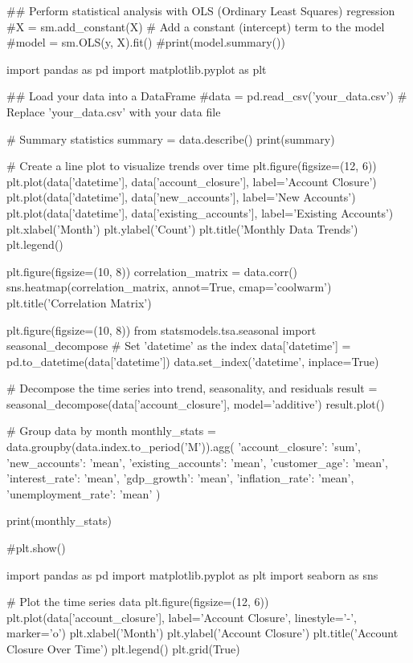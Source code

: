 ## Perform statistical analysis with OLS (Ordinary Least Squares) regression
#X = sm.add_constant(X)  # Add a constant (intercept) term to the model
#model = sm.OLS(y, X).fit()
#print(model.summary())





import pandas as pd
import matplotlib.pyplot as plt

## Load your data into a DataFrame
#data = pd.read_csv('your_data.csv')  # Replace 'your_data.csv' with your data file

# Summary statistics
summary = data.describe()
print(summary)

# Create a line plot to visualize trends over time
plt.figure(figsize=(12, 6))
plt.plot(data['datetime'], data['account_closure'], label='Account Closure')
plt.plot(data['datetime'], data['new_accounts'], label='New Accounts')
plt.plot(data['datetime'], data['existing_accounts'], label='Existing Accounts')
plt.xlabel('Month')
plt.ylabel('Count')
plt.title('Monthly Data Trends')
plt.legend()
 


plt.figure(figsize=(10, 8))
correlation_matrix = data.corr()
sns.heatmap(correlation_matrix, annot=True, cmap='coolwarm')
plt.title('Correlation Matrix')






plt.figure(figsize=(10, 8))
from statsmodels.tsa.seasonal import seasonal_decompose
# Set 'datetime' as the index
data['datetime'] = pd.to_datetime(data['datetime'])
data.set_index('datetime', inplace=True)

# Decompose the time series into trend, seasonality, and residuals
result = seasonal_decompose(data['account_closure'], model='additive')
result.plot()



# Group data by month
monthly_stats = data.groupby(data.index.to_period('M')).agg({
    'account_closure': 'sum',
    'new_accounts': 'mean',
    'existing_accounts': 'mean',
    'customer_age': 'mean',
    'interest_rate': 'mean',
    'gdp_growth': 'mean',
    'inflation_rate': 'mean',
    'unemployment_rate': 'mean'
})

print(monthly_stats)


#plt.show()
 
import pandas as pd
import matplotlib.pyplot as plt
import seaborn as sns
 
# Plot the time series data
plt.figure(figsize=(12, 6))
plt.plot(data['account_closure'], label='Account Closure', linestyle='-', marker='o')
plt.xlabel('Month')
plt.ylabel('Account Closure')
plt.title('Account Closure Over Time')
plt.legend()
plt.grid(True)
 
